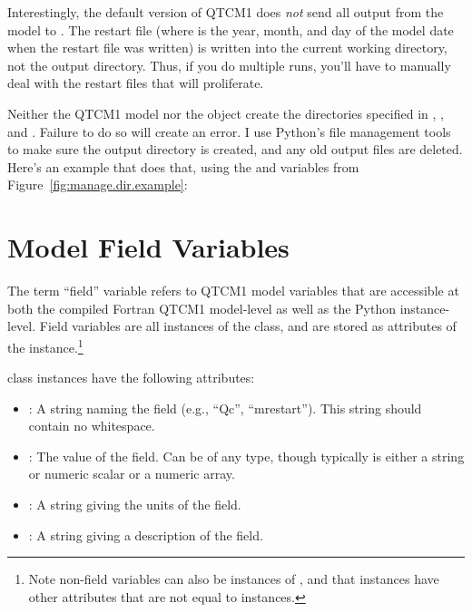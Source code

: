 Interestingly, the default version of QTCM1 does \emph{not} send
all output from the model to .  The restart file
 (where 
is the year, month, and day of the model date when the restart
file was written) is written into the current working directory,
not the output directory.  Thus, if you do multiple runs, you'll
have to manually deal with the restart files that will proliferate.

Neither the QTCM1 model nor the  object
create the directories specified in , ,
and .  Failure to do so will create an error.  I use
Python's file management tools to make sure the output directory
is created, and any old output files are deleted.  Here's an example
that does that, using the  and 
variables from Figure~\ref{fig:manage.dir.example}:

\begin{codeblock}
\end{codeblock}




\section{Model Field Variables}   \label{sec:field.variables.intro}

The term ``field'' variable refers to QTCM1 model variables that 
are accessible at both the compiled Fortran QTCM1 model-level as
well as the Python  instance-level.
Field variables are all instances of the  class,
and are stored as attributes of the  instance.\footnote%
	{Note non-field variables can also be instances of ,
	and that  instances have other attributes that are
	not equal to  instances.}

 class instances have the following attributes:
\begin{itemize}
\item {}:  A string naming the field (e.g., ``Qc'', ``mrestart'').
	This string should contain no whitespace.
\item {}:  The value of the field.  Can be of any type, though
	typically is either a string or numeric scalar or a numeric array.
\item {}:  A string giving the units of the field.
\item {}:  A string giving a description of the field.
\end{itemize}

